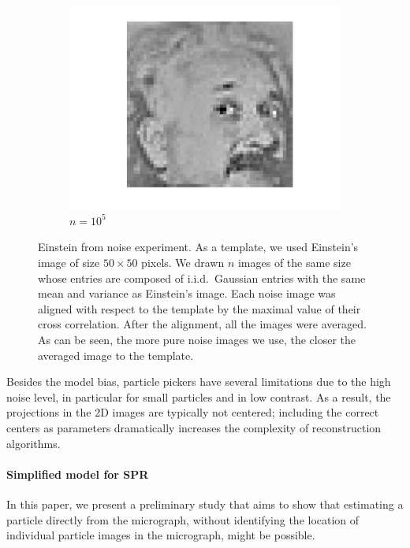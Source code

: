 \documentclass[english,11pt]{article}
\numberwithin{equation}{section}
\theoremstyle{plain}
\theoremstyle{definition}
\theoremstyle{remark}
\theoremstyle{plain}
\theoremstyle{remark}
\theoremstyle{plain}
\theoremstyle{plain}
\begin{document}
\begin{figure}[h!]
\begin{subfigure}[h]{0.3\textwidth}
	\includegraphics[scale=0.3]{Einstein_from_noise_n100000}
	\caption{$n = 10^5$}
\end{subfigure}

	\caption{\label{fig:EinsteinFromNoise} Einstein from noise experiment. As a template, we used Einstein's image of size $50\times 50$ pixels. We drawn $n$ images of the same size whose entries are composed of i.i.d.\ Gaussian entries with the same mean and variance as Einstein's image. Each noise image was aligned with respect to the template by the maximal value of their cross correlation. After the alignment, all the images were averaged. As can be seen, the more pure noise images we use, the closer the averaged image to the template.   }	
\end{figure}

Besides the model bias, particle pickers have several limitations due to the high noise level, in particular for small particles and in low contrast. 
As a result, the projections in the 2D images are typically not centered; including the correct centers as parameters dramatically increases the complexity of reconstruction algorithms.

\paragraph{Simplified model for SPR} In this paper, we present a preliminary study that aims to show that estimating a particle 
directly from the micrograph, without identifying the location of individual particle images in the micrograph, might be possible. 
\end{document}
